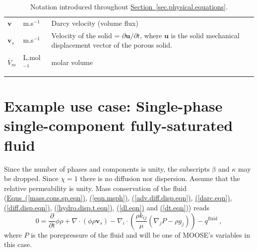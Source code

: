 \documentclass[12pt]{report}
\def\species{\kappa}
\def\phase{\mathrm{\beta}}
\def\massfrac{\chi}
\def\darcyvel{\mathbf{v}}
\begin{document}
\begin{longtable}{llp{10cm}}
$\darcyvel$ & m.s$^{-1}$ & Darcy velocity (volume flux) \\

${\mathbf v}_{s}$ & m.s$^{-1}$ & Velocity of the solid = $\partial
{\mathbf u}/\partial t$, where ${\mathbf u}$ is the solid mechanical
displacement vector of the porous solid. \\

$\overline{V}_{m}$ & L.mol$^{-1}$ & molar volume \\
\hline
\caption{Notation introduced throughout
  \hyperref[sec.physical.equations]{Section~\ref*{sec.physical.equations}}.}
\label{table.notation}
\end{longtable}


\section{Example use case: Single-phase single-component fully-saturated fluid}

Since the number of phases and components is unity, the subscripts
$\phase$ and $\species$ may be dropped.  Since $\massfrac=1$ there is
no diffusion nor dispersion.  Assume that the relative permeability is
unity.  Mass conservation of the fluid
(\hyperref[mass.cons.sp.eqn]{Eqns~(\ref*{mass.cons.sp.eqn})},
\hyperref[eqn.msph]{(\ref*{eqn.msph})},
\hyperref[adv.diff.disp.eqn]{(\ref*{adv.diff.disp.eqn})},
\hyperref[darc.eqn]{(\ref*{darc.eqn})},
\hyperref[diff.disp.eqn]{(\ref*{diff.disp.eqn})},
\hyperref[hydro.disp.t.eqn]{(\ref*{hydro.disp.t.eqn})},
\hyperref[dl.eqn]{(\ref*{dl.eqn})} and
\hyperref[dt.eqn]{(\ref*{dt.eqn})}) reads
\begin{equation}
0 = \frac{\partial}{\partial t}\phi\rho +
\nabla\cdot(\phi\rho{\mathbf{v}_{s}}) - \nabla_{i}\cdot\left(\frac{\rho
  k_{ij}}{\mu}(\nabla_{j} P - \rho g_{j}) \right) - q^{\mathrm{fluid}}
\ ,
\label{1phase.flow.eqn}
\end{equation}
where $P$ is the porepressure of the fluid and will be one of MOOSE's
variables in this case.
\end{document}
